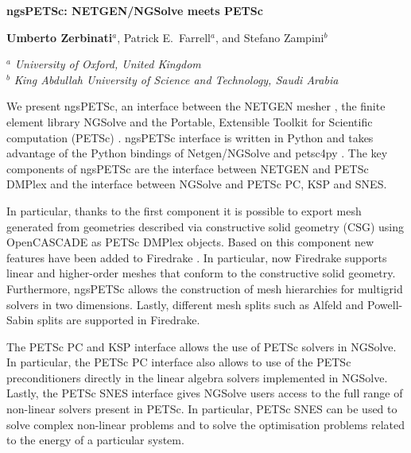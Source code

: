 \documentclass[a4paper,11pt]{article}
\begin{document}

\newpage

\begin{center}
\bgroup
\large
\bf
ngsPETSc: NETGEN/NGSolve meets PETSc
\egroup
\bigskip

\textbf{Umberto Zerbinati}$^a$, Patrick E.~Farrell$^{a}$, and Stefano Zampini$^b$
\medskip

$^a$ {\em University of Oxford, United Kingdom}\\
$^b$ {\em King Abdullah University of Science and Technology, Saudi Arabia}\\
\end{center}
\bigskip

\noindent
We present ngsPETSc, an interface between the NETGEN mesher \cite{netgen}, the finite element library NGSolve \cite{ngsolve} and the Portable, Extensible Toolkit for Scientific computation (PETSc) \cite{petsc}.
ngsPETSc interface is written in Python and takes advantage of the Python bindings of Netgen/NGSolve and petsc4py \cite{petsc4py}.
The key components of ngsPETSc are the interface between NETGEN and PETSc DMPlex and the interface between NGSolve and PETSc PC, KSP and SNES.

In particular, thanks to the first component it is possible to export mesh generated from geometries described via constructive solid geometry (CSG) using OpenCASCADE as PETSc DMPlex objects.
Based on this component new features have been added to Firedrake \cite{firedrake}.
In particular, now Firedrake supports linear and higher-order meshes that conform to the constructive solid geometry.
Furthermore, ngsPETSc allows the construction of mesh hierarchies for multigrid solvers in two dimensions.
Lastly, different mesh splits such as Alfeld and Powell-Sabin splits are supported in Firedrake.

The PETSc PC and KSP interface allows the use of PETSc solvers in NGSolve.
In particular, the PETSc PC interface also allows to use of the PETSc preconditioners directly in the linear algebra solvers implemented in NGSolve.
Lastly, the PETSc SNES interface gives NGSolve users access to the full range of non-linear solvers present in PETSc.
In particular, PETSc SNES can be used to solve complex non-linear problems and to solve the optimisation problems related to the energy of a particular system.
\end{document}
